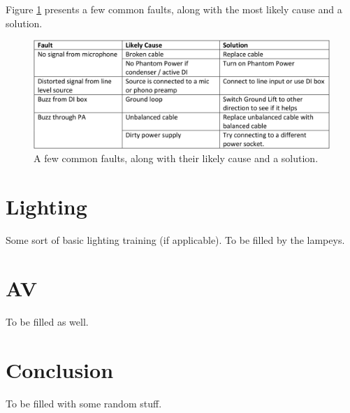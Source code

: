 \documentclass[14pt,twocolumn]{extarticle} %
\begin{document}
Figure \ref{fig:common-faults} presents a few common faults, along with the most likely cause and a solution.

\begin{figure}[h!]
\begin{center}

\includegraphics[width=18.5cm]{common-faults.png}
\caption{A few common faults, along with their likely cause and a solution.}
\label{fig:common-faults}

\end{center}
\end{figure}



\section{Lighting}
\label{lighting}
Some sort of basic lighting training (if applicable). To be filled by the lampeys.

\section{AV}
\label{av}
To be filled as well.

\section{Conclusion}
\label{conclusion}
To be filled with some random stuff.

%

 
\end{document}
